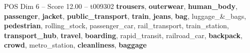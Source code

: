 \begin{textsample}{POS Dim 6 – Score 12.00 – t009302}  \label{ex:f6_pos_033}
\textbf{trousers}, \textbf{outerwear}, \textbf{human\_body}, \textbf{passenger}, \textbf{jacket}, \textbf{public\_transport}, \textbf{train}, \textbf{jeans}, \textbf{bag}, luggage\_\&\_bags, \textbf{pedestrian}, rolling\_stock, passenger\_car, rail\_transport, train\_station, \textbf{transport\_hub}, \textbf{travel}, \textbf{boarding}, rapid\_transit, railroad\_car, \textbf{backpack}, \textbf{crowd}, metro\_station, \textbf{cleanliness}, \textbf{baggage}

\end{textsample}
